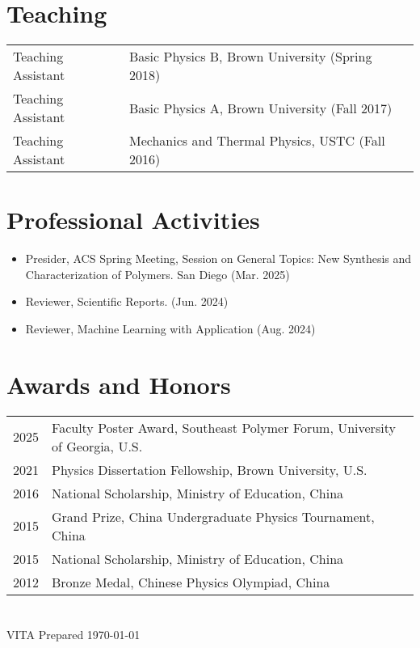 \documentclass[11pt,letterpaper]{article}
\begin{document}
\section*{Teaching}
\vspace*{-0.15in}
\begin{longtable}{l p{\linewidth}}
    Teaching Assistant & Basic Physics B, Brown University (Spring 2018) \\
    Teaching Assistant & Basic Physics A, Brown University (Fall 2017) \\
    Teaching Assistant & Mechanics and Thermal Physics, USTC (Fall 2016)
\end{longtable}


\section*{Professional Activities}
\vspace*{-0.15in}
\begin{itemize}
    \item Presider, ACS Spring Meeting, Session on General Topics: New Synthesis and Characterization of Polymers. San Diego (Mar. 2025)
    \item Reviewer, Scientific Reports. (Jun. 2024)
    \item Reviewer, Machine Learning with Application (Aug. 2024)
\end{itemize}

\section*{Awards and Honors}
\vspace*{-0.15in}
\begin{longtable}{l p{\linewidth}}
    2025 & Faculty Poster Award, Southeast Polymer Forum, University of Georgia, U.S. \\
    2021 & Physics Dissertation Fellowship, Brown University, U.S.    \\
    2016 & National Scholarship, Ministry of Education, China         \\
    2015 & Grand Prize, China Undergraduate Physics Tournament, China \\
    2015 & National Scholarship, Ministry of Education, China         \\
    2012 & Bronze Medal, Chinese Physics Olympiad, China              \\
\end{longtable}

\section*{}
VITA Prepared \today
\end{document}
